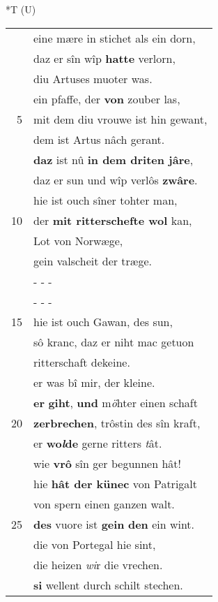 \documentclass[8pt,a4paper,notitlepage]{article}
\begin{document}
\begin{table}[ht]
\begin{minipage}[t]{0.5\linewidth}
\end{minipage}
\hspace{0.5cm}
\begin{minipage}[t]{0.5\linewidth}
\small
\begin{center}*T (U)
\end{center}
\begin{tabular}{rl}
 & eine mære in stichet als ein dorn,\\ 
 & daz er sîn wîp \textbf{hatte} verlorn,\\ 
 & diu Artuses muoter was.\\ 
 & ein pfaffe, der \textbf{von} zouber las,\\ 
5 & mit dem diu vrouwe ist hin gewant,\\ 
 & dem ist Artus nâch gerant.\\ 
 & \textbf{daz} ist nû \textbf{in dem driten jâre},\\ 
 & daz er sun und wîp verlôs \textbf{zwâre}.\\ 
 & hie ist ouch sîner tohter man,\\ 
10 & der \textbf{mit ritterschefte wol} kan,\\ 
 & Lot von Norwæge,\\ 
 & gein valscheit der træge.\\ 
 & \multicolumn{1}{l}{ - - - }\\ 
 & \multicolumn{1}{l}{ - - - }\\ 
15 & hie ist ouch Gawan, des sun,\\ 
 & sô kranc, daz er niht mac getuon\\ 
 & ritterschaft dekeine.\\ 
 & er was bî mir, der kleine.\\ 
 & \textbf{er} \textbf{giht}, \textbf{und} m\textit{ö}hter einen schaft\\ 
20 & \textbf{zerbrechen}, trôstin des sîn kraft,\\ 
 & er \textbf{wo\textit{l}de} gerne ritters \textit{t}ât.\\ 
 & wie \textbf{vrô} sîn ger begunnen hât!\\ 
 & hie \textbf{hât der künec} von Patrigalt\\ 
 & von spern einen ganzen walt.\\ 
25 & \textbf{des} vuore ist \textbf{gein} \textbf{den} ein wint.\\ 
 & die von Portegal hie sint,\\ 
 & die heizen \textit{wi}r die vrechen.\\ 
 & \textbf{si} wellent durch schilt stechen.\\ 

\end{tabular}
\end{minipage}
\end{table}
\end{document}

